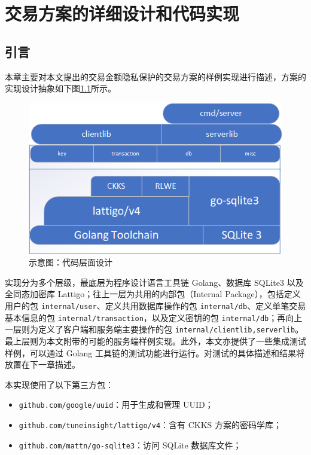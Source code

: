 \chapter{交易方案的详细设计和代码实现}

\section{引言}

本章主要对本文提出的交易金额隐私保护的交易方案的样例实现进行描述，方案的实现设计抽象如下图\ref*{Fig:Design}所示。

\begin{figure}[ht]
    \centering
    \includegraphics[width=0.8\linewidth]{Figures/abstract_on_chimata.png}
    \caption{示意图：代码层面设计}\label{Fig:Design}
\end{figure}

实现分为多个层级，最底层为程序设计语言工具链 Golang、数据库 SQLite3 以及全同态加密库 Lattigo；往上一层为共用的内部包（Internal Package），包括定义用户的包 \verb|internal/user|、定义共用数据库操作的包 \verb|internal/db|、定义单笔交易基本信息的包 \verb|internal/transaction|，以及定义密钥的包 \verb|internal/db|；再向上一层则为定义了客户端和服务端主要操作的包 \verb|internal/clientlib,serverlib|。最上层则为本文附带的可能的服务端样例实现。此外，本文亦提供了一些集成测试样例，可以通过 Golang 工具链的测试功能进行运行。对测试的具体描述和结果将放置在下一章描述。

本实现使用了以下第三方包：

\begin{itemize}
    \item \verb|github.com/google/uuid|：用于生成和管理 UUID；
    \item \verb|github.com/tuneinsight/lattigo/v4|：含有 CKKS 方案的密码学库；
    \item \verb|github.com/mattn/go-sqlite3|：访问 SQLite 数据库文件；
\end{itemize}

